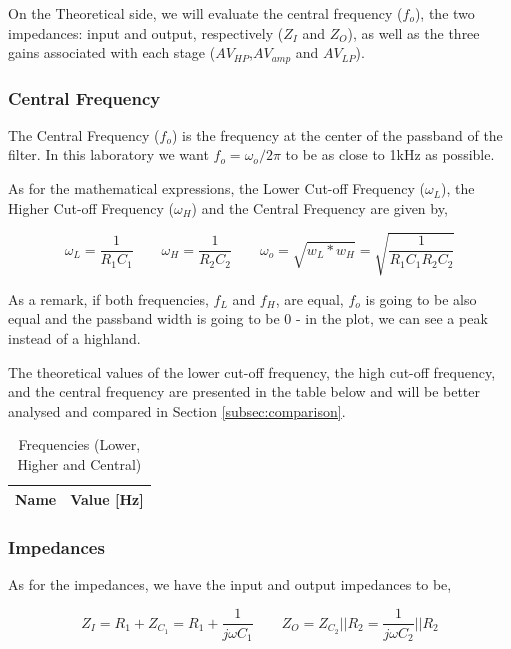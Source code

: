 On the Theoretical side, we will evaluate the central frequency ($f_o$), the two impedances: input and output, respectively ($Z_I$ and $Z_O$), as well as the three gains associated with each stage ($AV_{HP}$,$AV_{amp}$ and $AV_{LP}$).

\subsubsection{Central Frequency}

The Central Frequency ($f_o$) is the frequency at the center of the passband of the filter. In this laboratory we want $f_o=\omega_o/2\pi$ to be as close to 1kHz as possible.
\par
As for the mathematical expressions, the Lower Cut-off Frequency ($\omega_L$), the Higher Cut-off Frequency ($\omega_H$) and the Central Frequency are given by,

\begin{equation}
    \omega_L=\frac{1}{R_1C_1} \qquad \omega_H=\frac{1}{R_2C_2} \qquad \omega_o=\sqrt{w_L*w_H}=\sqrt{\frac{1}{R_1C_1R_2C_2}}
\end{equation}

As a remark, if both frequencies, $f_L$ and $f_H$, are equal, $f_o$ is going to be also equal and the passband width is going to be 0 - in the plot, we can see a peak instead of a highland.

The theoretical values of the lower cut-off frequency, the high cut-off frequency, and the central frequency are presented in the table below and will be better analysed and compared in Section \ref{subsec:comparison}.

\begin{table}[h]
   \centering
   \begin{tabular}{|l|c|}
   \hline
   {\bf Name} & {\bf Value [Hz]} \\ \hline
   
   \end{tabular}
   \caption{Frequencies (Lower, Higher and Central)}
   \label{tab:theo_freq}
\end{table}

\subsubsection{Impedances}

As for the impedances, we have the input and output impedances to be,

\begin{equation}
    Z_I=R_1+Z_{C_1}=R_1+\frac{1}{j\omega C_1} \qquad Z_O=Z_{C_2} || R_2 = \frac{1}{j\omega C_2} || R_2
\end{equation}

